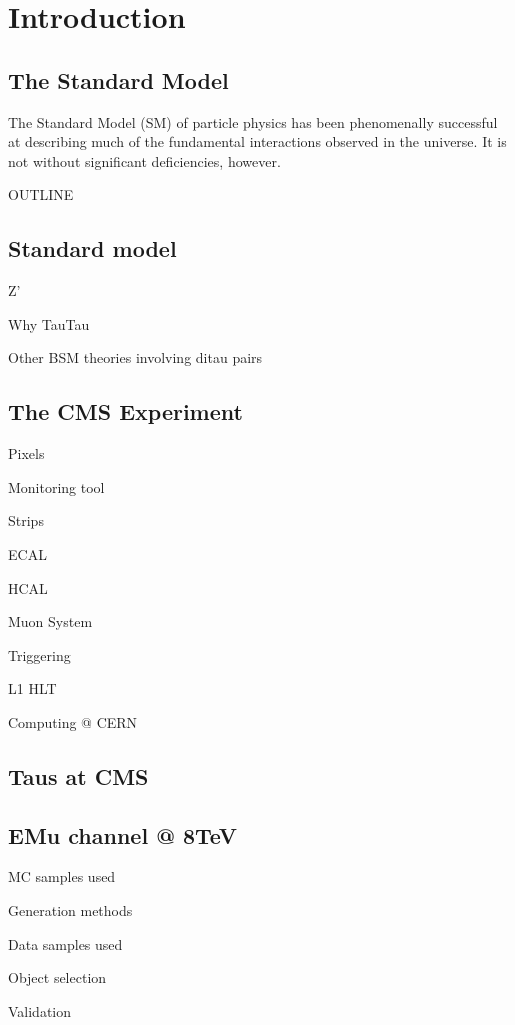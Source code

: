 \chapter{Introduction}
\label{introchap}

\section{The Standard Model}

The Standard Model (SM) of particle physics has been phenomenally successful at describing much of the fundamental interactions observed in the universe. It is not without significant deficiencies, however. 


OUTLINE

\section{Standard model}

Z' 

Why TauTau

Other BSM theories involving ditau pairs


\section{The CMS Experiment}

Pixels

	Monitoring tool

Strips

ECAL

HCAL

Muon System

Triggering

	L1
	HLT
	
Computing @ CERN	

\section{Taus at CMS}

\section{EMu channel @ 8TeV}

MC samples used

	Generation methods
	
Data samples used

Object selection

Validation

